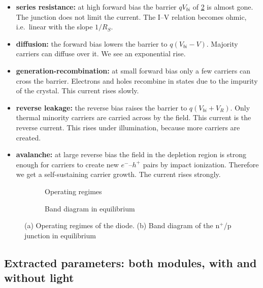 \begin{itemize}
  \item \textbf{series resistance:} at high forward bias the barrier $qV_{bi}$ of \cref{fig:diode-bands}
  is almost gone. The junction does not limit the current. The I--V relation becomes ohmic, i.e.\ linear with the slope $1/R_S$.
  \item \textbf{diffusion:} the forward bias lowers the barrier to $q(V_{bi}-V)$. Majority carriers can
  diffuse over it. We see an exponential rise.
  \item \textbf{generation-recombination:} at small forward bias only a few carriers can cross the barrier.
  Electrons and holes recombine in states due to the impurity of the crystal. This current rises
  slowly.
  \item \textbf{reverse leakage:} the reverse bias raises the barrier to $q(V_{bi}+V_R)$. 
  Only thermal minority carriers are carried across by the field. This current is the reverse current. This rises under illumination, because more carriers are created.
  \item \textbf{avalanche:} at large reverse bias the field in the depletion region is strong enough 
  for carriers to create new $e^-$--$h^+$ pairs by impact ionization. Therefore we get a self-sustaining carrier growth. The current rises strongly.
\end{itemize}

\begin{figure}[h!]
  \centering
  \begin{subfigure}[b]{0.62\linewidth}
    \centering
    \resizebox{\linewidth}{!}{}
    \caption{Operating regimes}
    \label{fig:diode-regions}
  \end{subfigure}\hfill
  \begin{subfigure}[b]{0.34\linewidth}
    \centering
    
    \caption{Band diagram in equilibrium}
    \label{fig:diode-bands}
  \end{subfigure}
  \caption{(a) Operating regimes of the diode. (b) Band diagram of the n$^+$/p junction in
  equilibrium\protect\footnotemark}
  \label{fig:diode-regions-bands}
\end{figure}


\pagebreak
\subsection{Extracted parameters: both modules, with and without light}\label{sec:iv-params}

